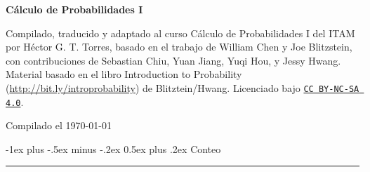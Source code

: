 \documentclass[12,landscape]{article}
\makeatletter
\renewcommand{\section}{\@startsection{section}{1}{0mm}%
                                {-1ex plus -.5ex minus -.2ex}%
                                {0.5ex plus .2ex}%
                                {\normalfont\large\bfseries}}
\renewcommand{\subsection}{\@startsection{subsection}{2}{0mm}%
                                {-1explus -.5ex minus -.2ex}%
                                {0.5ex plus .2ex}%
                                {\normalfont\normalsize\bfseries}}
\makeatother
\begin{document}
\raggedright
\footnotesize
\begin{multicols*}{3}

\setlength{\premulticols}{1pt}
\setlength{\postmulticols}{1pt}
\setlength{\multicolsep}{1pt}
\setlength{\columnsep}{2pt}


\begin{center}
    {\color{black} \Large{\textbf{Cálculo de Probabilidades I}}} \\
\end{center}


\scriptsize

Compilado, traducido y adaptado al curso Cálculo de Probabilidades I del ITAM por Héctor G. T. Torres, basado en el trabajo de William Chen y Joe Blitzstein, con contribuciones de Sebastian Chiu, Yuan Jiang, Yuqi Hou, y Jessy Hwang. Material basado en el libro Introduction to Probability (\url{http://bit.ly/introprobability}) de Blitztein/Hwang. Licenciado bajo \texttt{\href{http://creativecommons.org/licenses/by-nc-sa/4.0/}{CC BY-NC-SA 4.0}}. 

\begin{center}
    Compilado el \today
\end{center}




\section{Conteo}\smallskip \hrule height 2pt \smallskip



\end{multicols*}
\end{document}
